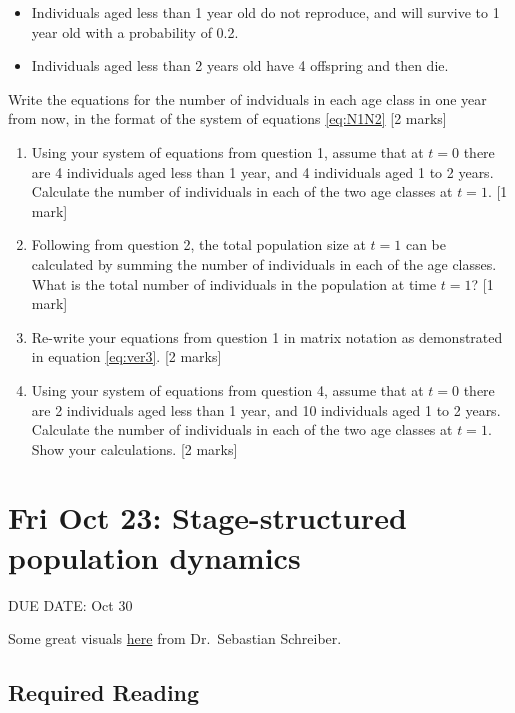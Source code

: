 \documentclass[]{book}
\begin{document}
\begin{itemize}
\item
  Individuals aged less than 1 year old do not reproduce, and will
  survive to 1 year old with a probability of 0.2.
\item
  Individuals aged less than 2 years old have 4 offspring and then die.
\end{itemize}

Write the equations for the number of indviduals in each age class in
one year from now, in the format of the system of equations
\eqref{eq:N1N2} {[}2 marks{]}

\begin{enumerate}
\def\labelenumi{\arabic{enumi}.}
\setcounter{enumi}{1}
\item
  Using your system of equations from question 1, assume that at \(t=0\)
  there are 4 individuals aged less than 1 year, and 4 individuals aged
  1 to 2 years. Calculate the number of individuals in each of the two
  age classes at \(t=1\). {[}1 mark{]}
\item
  Following from question 2, the total population size at \(t=1\) can be
  calculated by summing the number of individuals in each of the age
  classes. What is the total number of individuals in the population at
  time \(t=1\)? {[}1 mark{]}
\item
  Re-write your equations from question 1 in matrix notation as
  demonstrated in equation \eqref{eq:ver3}. {[}2 marks{]}
\item
  Using your system of equations from question 4, assume that at \(t=0\)
  there are 2 individuals aged less than 1 year, and 10 individuals aged
  1 to 2 years. Calculate the number of individuals in each of the two
  age classes at \(t=1\). Show your calculations. {[}2 marks{]}
\end{enumerate}

\chapter{Fri Oct 23: Stage-structured population
dynamics}\label{fri-oct-23-stage-structured-population-dynamics}

DUE DATE: Oct 30

Some great visuals
\href{https://twitter.com/seb_schreiber/status/1318574271854116866}{here}
from Dr.~Sebastian Schreiber.

\section{Required Reading}\label{required-reading}
\end{document}

